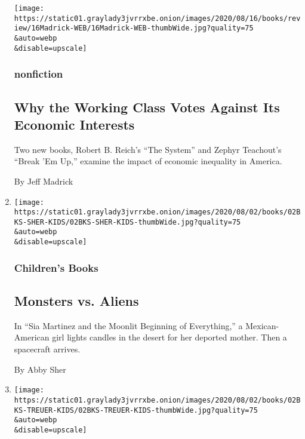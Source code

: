 \begin{enumerate}
  \texttt{[image: https://static01.graylady3jvrrxbe.onion/images/2020/08/16/books/review/16Madrick-WEB/16Madrick-WEB-thumbWide.jpg?quality=75\\\&auto=webp\\\&disable=upscale]}

  \hypertarget{nonfiction}{%
  \subsubsection{nonfiction}\label{nonfiction}}

  \hypertarget{why-the-working-class-votes-against-its-economic-interests}{%
  \subsection{Why the Working Class Votes Against Its Economic
  Interests}\label{why-the-working-class-votes-against-its-economic-interests}}

  Two new books, Robert B. Reich's ``The System'' and Zephyr Teachout's
  ``Break 'Em Up,'' examine the impact of economic inequality in
  America.

  By Jeff Madrick
\item
  \href{/2020/07/31/books/review/sia-martinez-and-the-moonlit-beginning-of-everything-raquel-vasquez-gilliland.html}{}

  \texttt{[image: https://static01.graylady3jvrrxbe.onion/images/2020/08/02/books/02BKS-SHER-KIDS/02BKS-SHER-KIDS-thumbWide.jpg?quality=75\\\&auto=webp\\\&disable=upscale]}

  \hypertarget{childrens-books-2}{%
  \subsubsection{Children's Books}\label{childrens-books-2}}

  \hypertarget{monsters-vs-aliens}{%
  \subsection{Monsters vs. Aliens}\label{monsters-vs-aliens}}

  In ``Sia Martinez and the Moonlit Beginning of Everything,'' a
  Mexican-American girl lights candles in the desert for her deported
  mother. Then a spacecraft arrives.

  By Abby Sher
\item
  \href{/2020/07/31/books/review/the-brave-james-bird.html}{}

  \texttt{[image: https://static01.graylady3jvrrxbe.onion/images/2020/08/02/books/02BKS-TREUER-KIDS/02BKS-TREUER-KIDS-thumbWide.jpg?quality=75\\\&auto=webp\\\&disable=upscale]}


\end{enumerate}
